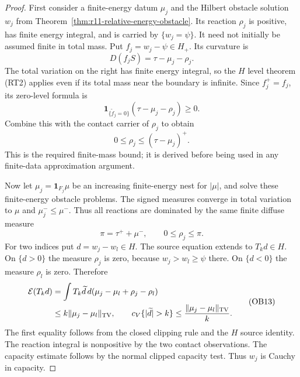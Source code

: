 \begin{proof}
First consider a finite-energy datum $\mu_j$ and the Hilbert obstacle
solution $w_j$ from Theorem~\ref{thm:r11-relative-energy-obstacle}.
Its reaction $\rho_j$ is positive, has finite energy integral, and is
carried by $\{w_j=\psi\}$.  It need not initially be assumed finite
in total mass.  Put $f_j=w_j-\psi\in H_+$.  Its curvature is
\[
                           D(f_jS)=\tau-\mu_j-\rho_j.
\]
The total variation on the right has finite energy integral, so the
$H$ level theorem (RT2) applies even if its total mass near the
boundary is infinite.  Since $f_j^+=f_j$, its zero-level formula is
\[
        \mathbf1_{\{\widetilde f_j=0\}}
                         (\tau-\mu_j-\rho_j)\ge0.
 \tag{OB10}
\]
Combine this with the contact carrier of $\rho_j$ to obtain
\[
                          0\le\rho_j\le(\tau-\mu_j)^+.
 \tag{OB11}
\]
This is the required finite-mass bound; it is derived before being
used in any finite-data approximation argument.

Now let $\mu_j=\mathbf1_{F_j}\mu$ be an increasing finite-energy
nest for $|\mu|$, and solve these finite-energy obstacle problems.
The signed measures converge in total variation to $\mu$ and
$\mu_j^-\le\mu^-$.  Thus all reactions are dominated by the same
finite diffuse measure
\[
                         \pi=\tau^++\mu^-,\qquad 0\le\rho_j\le\pi.
 \tag{OB12}
\]
For two indices put $d=w_j-w_l\in H$.  The source equation extends
to $T_kd\in H$.  On $\{d>0\}$ the measure $\rho_j$ is zero,
because $w_j>w_l\ge\psi$ there.  On $\{d<0\}$ the measure
$\rho_l$ is zero.  Therefore
\[
 \begin{split}
 \mathcal E(T_kd)
   &=\int T_k\widetilde d\,d(\mu_j-\mu_l+\rho_j-\rho_l)\\
   &\le k\|\mu_j-\mu_l\|_{\rm TV},\qquad
 c_V\{|\widetilde d|>k\}
                         \le\frac{\|\mu_j-\mu_l\|_{\rm TV}}{k}.
 \end{split}
 \tag{OB13}
\]
The first equality follows from the closed clipping rule and the
$H$ source identity.  The reaction integral is nonpositive by the
two contact observations.  The capacity estimate follows by the
normal clipped capacity test.  Thus $w_j$ is Cauchy in capacity.


\end{proof}
